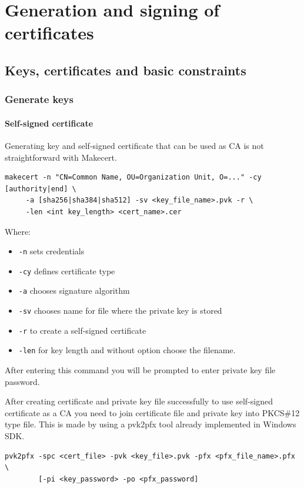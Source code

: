 \documentclass[10pt, a4paper]{report}
\begin{document}
\section{Generation and signing of certificates}

  \subsection{Keys, certificates and basic constraints}
  
    \subsubsection{Generate keys}

      \paragraph{Self-signed certificate}
Generating key and self-signed certificate that can be used as CA is not straightforward with Makecert.
\begin{verbatim}
makecert -n "CN=Common Name, OU=Organization Unit, O=..." -cy [authority|end] \
	 -a [sha256|sha384|sha512] -sv <key_file_name>.pvk -r \
	 -len <int key_length> <cert_name>.cer
\end{verbatim}

Where:
\begin{itemize}
\item \verb+-n+ sets credentials
\item \verb+-cy+ defines certificate type
\item \verb+-a+ chooses signature algorithm
\item \verb+-sv+ chooses name for file where the private key is stored
\item \verb+-r+ to create a self-signed certificate
\item \verb+-len+ for key length and without option choose the filename.
\end{itemize}

After entering this command you will be prompted to enter private key file password.

After creating certificate and private key file successfully to use self-signed certificate as a CA you need to join certificate file and private key into PKCS\#12 type file. This is made by using a pvk2pfx tool already implemented in Windows SDK.
\begin{verbatim}
pvk2pfx -spc <cert_file> -pvk <key_file>.pvk -pfx <pfx_file_name>.pfx \
        [-pi <key_password> -po <pfx_password]
\end{verbatim}
\end{document}
